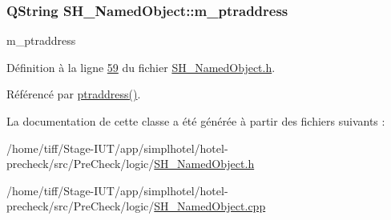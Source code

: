 \hypertarget{classSH__NamedObject_acfc489299f90750082785bf9ac42f4ff}{
\subsubsection[{m\-\_\-ptraddress}]{\setlength{\rightskip}{0pt plus 5cm}Q\-String S\-H\-\_\-\-Named\-Object\-::m\-\_\-ptraddress\hspace{0.3cm}{\ttfamily [private]}}}\label{classSH__NamedObject_acfc489299f90750082785bf9ac42f4ff}


m\-\_\-ptraddress 



Définition à la ligne \hyperlink{SH__NamedObject_8h_source_l00059}{59} du fichier \hyperlink{SH__NamedObject_8h_source}{S\-H\-\_\-\-Named\-Object.\-h}.



Référencé par \hyperlink{classSH__NamedObject_a147d0e52d9f0fc1d3a423d02f82325f5}{ptraddress()}.



La documentation de cette classe a été générée à partir des fichiers suivants \-:\begin{DoxyCompactItemize}
\item 
/home/tiff/\-Stage-\/\-I\-U\-T/app/simplhotel/hotel-\/precheck/src/\-Pre\-Check/logic/\hyperlink{SH__NamedObject_8h}{S\-H\-\_\-\-Named\-Object.\-h}\item 
/home/tiff/\-Stage-\/\-I\-U\-T/app/simplhotel/hotel-\/precheck/src/\-Pre\-Check/logic/\hyperlink{SH__NamedObject_8cpp}{S\-H\-\_\-\-Named\-Object.\-cpp}\end{DoxyCompactItemize}

